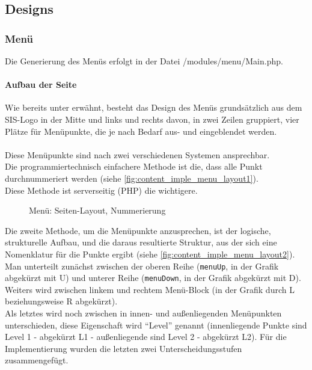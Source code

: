 \newpage

\subsection{Designs}
\subsubsection{Menü}
Die Generierung des Menüs erfolgt in der Datei /modules/menu/Main.php.\\
\paragraph{Aufbau der Seite\\}
Wie bereits unter  erwähnt, besteht das Design des Menüs grundsätzlich aus dem SIS-Logo in der Mitte und links und rechts davon, in zwei Zeilen gruppiert, vier Plätze für Menüpunkte, die je nach Bedarf aus- und eingeblendet werden.\\
\\
Diese Menüpunkte sind nach zwei verschiedenen Systemen ansprechbar.\\
Die programmiertechnisch einfachere Methode ist die, dass alle Punkt durchnummeriert werden (siehe \autoref{fig:content_imple_menu_layout1}).\\ Diese Methode ist serverseitig (PHP) die wichtigere.
\begin{figure}[H]
\centering
{}
\caption{Menü: Seiten-Layout, Nummerierung}
\label{fig:content_imple_menu_layout1}
\end{figure}
Die zweite Methode, um die Menüpunkte anzusprechen, ist der logische, strukturelle Aufbau, und die daraus resultierte Struktur, aus der sich eine Nomenklatur für die Punkte ergibt (siehe \autoref{fig:content_imple_menu_layout2}).\\
Man unterteilt zunächst zwischen der oberen Reihe (\texttt{menuUp}, in der Grafik abgekürzt mit U) und unterer Reihe (\texttt{menuDown}, in der Grafik abgekürzt mit D).\\
Weiters wird zwischen linkem und rechtem Menü-Block (in der Grafik durch L beziehungsweise R abgekürzt).\\
Als letztes wird noch zwischen in innen- und außenliegenden Menüpunkten unterschieden, diese Eigenschaft wird \enquote{Level} genannt (innenliegende Punkte sind Level 1 - abgekürzt L1 - außenliegende sind Level 2 - abgekürzt L2). Für die Implementierung wurden die letzten zwei Unterscheidungsstufen zusammengefügt.\\
